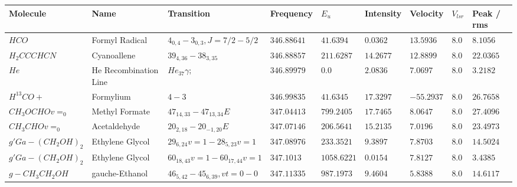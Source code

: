 \documentclass[10pt]{article}
\begin{document}
\begin{table}[htb]
\small
    \centering    
    \begin{tabular}{l l l l l l l l l} 


\hline
Molecule & Name & Transition & Frequency & $E_{{u}}$ & Intensity & Velocity & $V_{{lsr}}$ & Peak / rms \\
\hline
$HCO$ & Formyl Radical & $4_{0,4}-3_{0,3},J=7/2-5/2$ & $346.88641$ & $41.6394$ & $0.0362$ & $13.5936$ & $8.0$ & $8.1056$\\
$H_{2}CCCHCN$ & Cyanoallene & $39_{4,36}-38_{3,35}$ & $346.88857$ & $211.6287$ & $14.2677$ & $12.8899$ & $8.0$ & $22.0365$\\
$He$ & He Recombination Line & $He_{37}\gamma;$ & $346.89979$ & $0.0$ & $2.0836$ & $7.0697$ & $8.0$ & $3.2182$\\
$H^{13}CO+$ & Formylium & $4-3$ & $346.99835$ & $41.6345$ & $17.3297$ & $-55.2937$ & $8.0$ & $26.7658$\\
$CH_{3}OCHOv=_{0}$ & Methyl Formate & $47_{14,33}-47_{13,34}E$ & $347.04413$ & $799.2405$ & $17.7465$ & $8.0647$ & $8.0$ & $27.4096$\\
$CH_{3}CHOv=_{0}$ & Acetaldehyde & $20_{2,18}-20_{-1,20}E$ & $347.07146$ & $206.5641$ & $15.2135$ & $7.0196$ & $8.0$ & $23.4973$\\
$g'Ga-(CH_{2}OH)_{2}$ & Ethylene Glycol & $29_{6,24}v=1-28_{5,23}v=1$ & $347.08976$ & $233.3521$ & $9.3897$ & $7.8703$ & $8.0$ & $14.5024$\\
$g'Ga-(CH_{2}OH)_{2}$ & Ethylene Glycol & $60_{18,43}v=1-60_{17,44}v=1$ & $347.1013$ & $1058.6221$ & $0.0154$ & $7.8127$ & $8.0$ & $3.4385$\\
$g-CH_{3}CH_{2}OH$ & gauche-Ethanol & $46_{5,42}-45_{6,39},vt=0-0$ & $347.11335$ & $987.1973$ & $9.4604$ & $5.8388$ & $8.0$ & $14.6117$\\
\hline



    \end{tabular}
\end{table}
\end{document}

